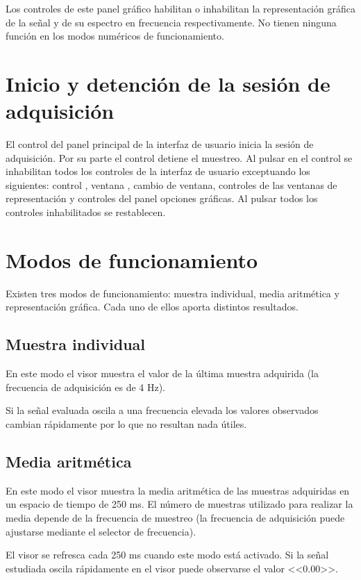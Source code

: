 Los controles de este panel gráfico habilitan o inhabilitan la
representación gráfica de la señal y de su espectro en frecuencia
respectivamente. No tienen ninguna función en los modos numéricos de
funcionamiento.


\section{Inicio y detención de la sesión de adquisición}

El control  del panel principal de la interfaz de usuario inicia
la sesión de adquisición. Por su parte el control  detiene el
muestreo. Al pulsar en el control  se inhabilitan todos los
controles de la interfaz de usuario exceptuando los siguientes: control
, ventana , cambio de ventana, controles de las ventanas
de representación y controles del panel opciones gráficas. Al pulsar
 todos los controles inhabilitados se restablecen.


\section{Modos de funcionamiento}

Existen tres modos de funcionamiento: muestra individual, media aritmética
y representación gráfica. Cada uno de ellos aporta distintos resultados.


\subsection{Muestra individual}

En este modo el visor muestra el valor de la última muestra adquirida (la
frecuencia de adquisición es de 4 Hz).

Si la señal evaluada oscila a una frecuencia elevada los valores observados
cambian rápidamente por lo que no resultan nada útiles.


\subsection{Media aritmética}

En este modo el visor muestra la media aritmética de las muestras
adquiridas en un espacio de tiempo de 250 ms. El número de muestras
utilizado para realizar la media depende de la frecuencia de muestreo (la
frecuencia de adquisición puede ajustarse mediante el selector de
frecuencia).

El visor se refresca cada 250 ms cuando este modo está activado. Si la
señal estudiada oscila rápidamente en el visor puede observarse el valor
<<$0.00$>>.


